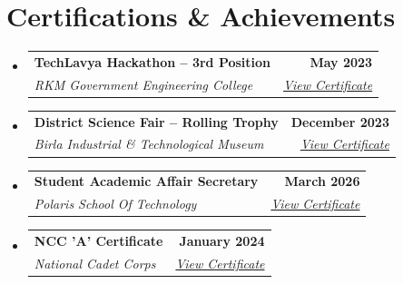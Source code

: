 \documentclass[letterpaper,11pt]{article}
\makeatletter
\newcommand{\resumeSubheading}[4]{
  \vspace{-2pt}\item
    \begin{tabular*}{1.0\textwidth}[t]{l@{\extracolsep{\fill}}r}
      \textbf{#1} & \textbf{\small #2} \\
      \textit{\small#3} & \textit{\small #4} \\
    \end{tabular*}\vspace{-7pt}
}
\newcommand{\resumeSubHeadingListStart}{\begin{itemize}[leftmargin=0.0in, label={}]}
\newcommand{\resumeSubHeadingListEnd}{\end{itemize}}
\makeatother
\begin{document}

\section{Certifications \& Achievements}

\resumeSubHeadingListStart

\resumeSubheading
  {TechLavya Hackathon -- 3rd Position}{May 2023}
  {RKM Government Engineering College}{\href{https://drive.google.com/file/d/1Z-MJ9e2C1IVl6XrIeIWWNUHpJJOTRSyf/view}{View Certificate}}

\resumeSubheading
  {District Science Fair -- Rolling Trophy}{December 2023}
  {Birla Industrial \& Technological Museum}{\href{https://drive.google.com/file/d/1cQrS_k-6xteAcXdJlHzx5iZNDki6TLaK/view}{View Certificate}}



  \resumeSubheading
  {Student Academic Affair Secretary}{March 2026}
  {Polaris School Of Technology}{\href{https://drive.google.com/file/d/1FF_hfLrAEKjEMFV2bX0N4SKXZGealICW/view}{View Certificate}} 


\resumeSubheading
  {NCC 'A' Certificate}{January 2024}
  {National Cadet Corps}{\href{https://drive.google.com/file/d/1FF_hfLrAEKjEMFV2bX0N4SKXZGealICW/view}{View Certificate}}
  

\resumeSubHeadingListEnd
\end{document}
